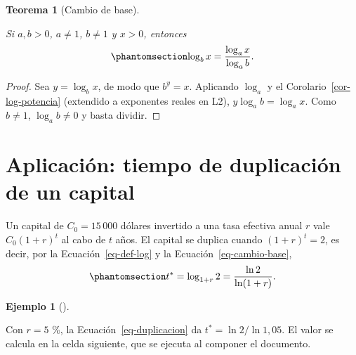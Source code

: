 \documentclass[
  spanish,
  letterpaper,
  a4paper,
  11pt,
  oneside,
  numbers=noenddot]{scrbook}
\theoremstyle{definition}
\theoremstyle{plain}
\theoremstyle{definition}
\theoremstyle{definition}
\newtheorem{example}{Ejemplo}[chapter]
\theoremstyle{plain}
\newtheorem{theorem}{Teorema}[chapter]
\theoremstyle{remark}
\begin{document}
\begin{theorem}[Cambio de
base]\protect\hypertarget{thm-cambio-base}{}\label{thm-cambio-base}

Si \(a, b > 0\), \(a \neq 1\), \(b \neq 1\) y \(x > 0\), entonces
\begin{equation}\protect\phantomsection\label{eq-cambio-base}{
\log_b x = \frac{\log_a x}{\log_a b} .
}\end{equation}

\end{theorem}

\begin{proof}
Sea \(y = \log_b x\), de modo que \(b^{y} = x\). Aplicando \(\log_a\) y
el Corolario~\ref{cor-log-potencia} (extendido a exponentes reales en
L2), \(y \log_a b = \log_a x\). Como \(b \neq 1\), \(\log_a b \neq 0\) y
basta dividir.
\end{proof}

\section{Aplicación: tiempo de duplicación de un
capital}\label{sec-duplicacion}

Un capital de \(C_0 = 15\,000\) dólares invertido a una tasa efectiva
anual \(r\) vale \(C_0 (1 + r)^{t}\) al cabo de \(t\) años. El capital
se duplica cuando \((1 + r)^{t} = 2\), es decir, por la
Ecuación~\ref{eq-def-log} y la Ecuación~\ref{eq-cambio-base},
\begin{equation}\protect\phantomsection\label{eq-duplicacion}{
t^{*} = \log_{1+r} 2 = \frac{\ln 2}{\ln(1 + r)} .
}\end{equation}

\begin{example}[]\protect\hypertarget{exm-duplicacion}{}\label{exm-duplicacion}

Con \(r = 5\) \%, la Ecuación~\ref{eq-duplicacion} da
\(t^{*} = \ln 2 / \ln 1{,}05\). El valor se calcula en la celda
siguiente, que se ejecuta al componer el documento.

\end{example}
\end{document}
